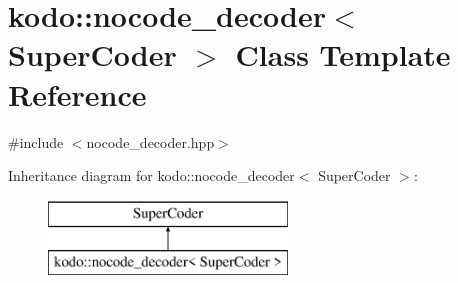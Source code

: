 \hypertarget{classkodo_1_1nocode__decoder}{\section{kodo\-:\-:nocode\-\_\-decoder$<$ Super\-Coder $>$ Class Template Reference}
\label{classkodo_1_1nocode__decoder}
}


{\ttfamily \#include $<$nocode\-\_\-decoder.\-hpp$>$}

Inheritance diagram for kodo\-:\-:nocode\-\_\-decoder$<$ Super\-Coder $>$\-:\begin{figure}[H]
\begin{center}
\leavevmode
\includegraphics[height=2.000000cm]{classkodo_1_1nocode__decoder}
\end{center}
\end{figure}
